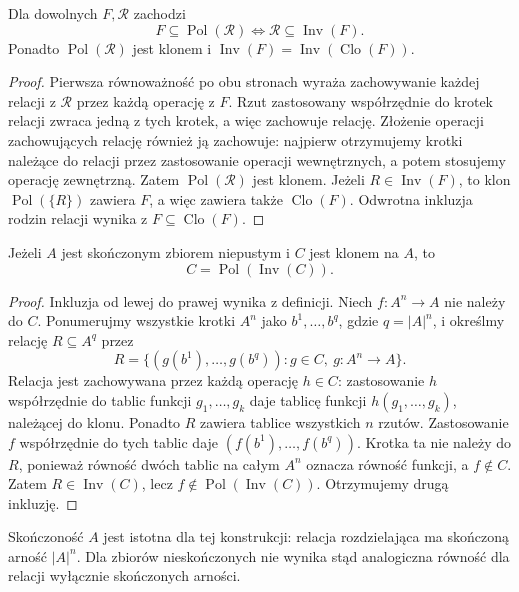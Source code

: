 \begin{lemat}
\label{lem:ncl-pol-inv-galois}
Dla dowolnych $F,\mathcal R$ zachodzi
\[
 F\subseteq\operatorname{Pol}(\mathcal R)
 \iff \mathcal R\subseteq\operatorname{Inv}(F).
\]
Ponadto $\operatorname{Pol}(\mathcal R)$ jest klonem
i $\operatorname{Inv}(F)=
\operatorname{Inv}(\operatorname{Clo}(F))$.
\end{lemat}
\begin{proof}
Pierwsza równoważność po obu stronach wyraża
zachowywanie każdej relacji z $\mathcal R$
przez każdą operację z $F$.
Rzut zastosowany współrzędnie do krotek relacji
zwraca jedną z tych krotek, a więc zachowuje relację.
Złożenie operacji zachowujących relację również
ją zachowuje: najpierw otrzymujemy krotki należące
do relacji przez zastosowanie operacji wewnętrznych,
a potem stosujemy operację zewnętrzną.
Zatem $\operatorname{Pol}(\mathcal R)$ jest klonem.
Jeżeli $R\in\operatorname{Inv}(F)$, to klon
$\operatorname{Pol}(\{R\})$ zawiera $F$,
a więc zawiera także $\operatorname{Clo}(F)$.
Odwrotna inkluzja rodzin relacji wynika z
$F\subseteq\operatorname{Clo}(F)$.
\end{proof}

\begin{twierdzenie}
\label{thm:ncl-finite-pol-inv}
Jeżeli $A$ jest skończonym zbiorem niepustym i $C$
jest klonem na $A$, to
\[
 C=\operatorname{Pol}(\operatorname{Inv}(C)).
\]
\end{twierdzenie}
\begin{proof}
Inkluzja od lewej do prawej wynika z definicji.
Niech $f:A^n\to A$ nie należy do $C$.
Ponumerujmy wszystkie krotki $A^n$ jako
$b^1,\ldots,b^q$, gdzie $q=|A|^n$, i określmy
relację $R\subseteq A^q$ przez
\[
 R=\{(g(b^1),\ldots,g(b^q)):
                g\in C,\ g:A^n\to A\}.
\]
Relacja jest zachowywana przez każdą operację
$h\in C$: zastosowanie $h$ współrzędnie do tablic
funkcji $g_1,\ldots,g_k$ daje tablicę funkcji
$h(g_1,\ldots,g_k)$, należącej do klonu.
Ponadto $R$ zawiera tablice wszystkich $n$ rzutów.
Zastosowanie $f$ współrzędnie do tych tablic
daje $(f(b^1),\ldots,f(b^q))$.
Krotka ta nie należy do $R$, ponieważ równość
dwóch tablic na całym $A^n$ oznacza równość funkcji,
a $f\notin C$. Zatem $R\in\operatorname{Inv}(C)$,
lecz $f\notin\operatorname{Pol}(\operatorname{Inv}(C))$.
Otrzymujemy drugą inkluzję.
\end{proof}
Skończoność $A$ jest istotna dla tej konstrukcji:
relacja rozdzielająca ma skończoną arność $|A|^n$.
Dla zbiorów nieskończonych nie wynika stąd analogiczna
równość dla relacji wyłącznie skończonych arności.

